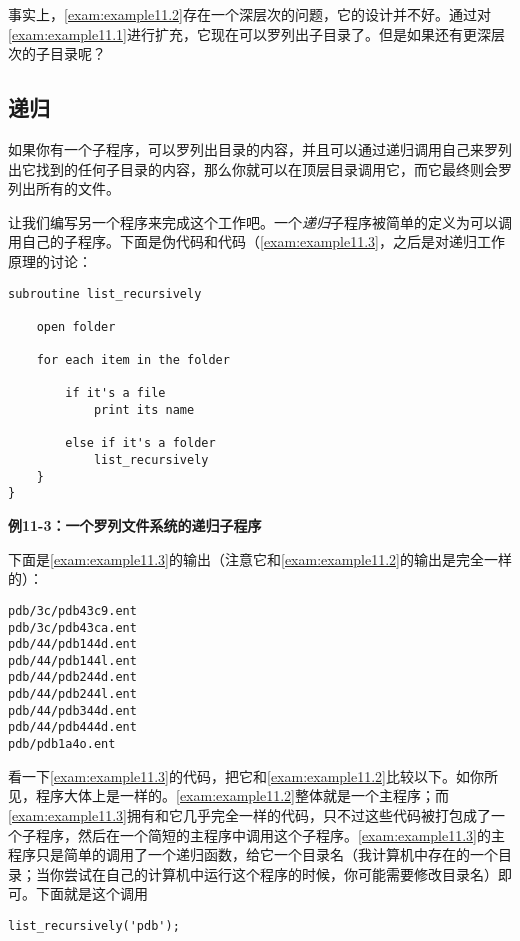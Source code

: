 事实上，\autoref{exam:example11.2}存在一个深层次的问题，它的设计并不好。通过对\autoref{exam:example11.1}进行扩充，它现在可以罗列出子目录了。但是如果还有更深层次的子目录呢？

\subsection{递归}
如果你有一个子程序，可以罗列出目录的内容，并且可以通过递归调用自己来罗列出它找到的任何子目录的内容，那么你就可以在顶层目录调用它，而它最终则会罗列出所有的文件。

让我们编写另一个程序来完成这个工作吧。一个\textit{递归}子程序被简单的定义为可以调用自己的子程序。下面是伪代码和代码（\autoref{exam:example11.3}，之后是对递归工作原理的讨论：

\begin{lstlisting}
subroutine list_recursively

    open folder

    for each item in the folder

        if it's a file
            print its name

        else if it's a folder
            list_recursively
    }
}
\end{lstlisting}

\textbf{例11-3：一个罗列文件系统的递归子程序}


下面是\autoref{exam:example11.3}的输出（注意它和\autoref{exam:example11.2}的输出是完全一样的）：

\begin{lstlisting}
pdb/3c/pdb43c9.ent
pdb/3c/pdb43ca.ent
pdb/44/pdb144d.ent
pdb/44/pdb144l.ent
pdb/44/pdb244d.ent
pdb/44/pdb244l.ent
pdb/44/pdb344d.ent
pdb/44/pdb444d.ent
pdb/pdb1a4o.ent
\end{lstlisting}

看一下\autoref{exam:example11.3}的代码，把它和\autoref{exam:example11.2}比较以下。如你所见，程序大体上是一样的。\autoref{exam:example11.2}整体就是一个主程序；而\autoref{exam:example11.3}拥有和它几乎完全一样的代码，只不过这些代码被打包成了一个子程序，然后在一个简短的主程序中调用这个子程序。\autoref{exam:example11.3}的主程序只是简单的调用了一个递归函数，给它一个目录名（我计算机中存在的一个目录；当你尝试在自己的计算机中运行这个程序的时候，你可能需要修改目录名）即可。下面就是这个调用

\begin{lstlisting}
list_recursively('pdb');
\end{lstlisting}

